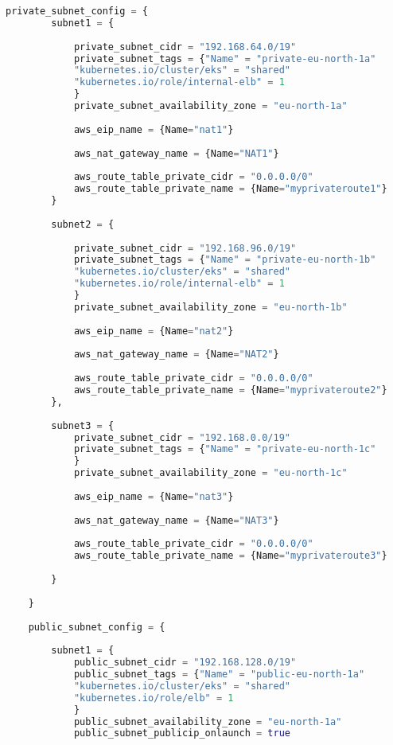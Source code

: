 \begin{lstlisting}[language=terraform]
    private_subnet_config = {
        subnet1 = {
    
            private_subnet_cidr = "192.168.64.0/19"
            private_subnet_tags = {"Name" = "private-eu-north-1a"
            "kubernetes.io/cluster/eks" = "shared"
            "kubernetes.io/role/internal-elb" = 1
            }
            private_subnet_availability_zone = "eu-north-1a"
    
            aws_eip_name = {Name="nat1"}
    
            aws_nat_gateway_name = {Name="NAT1"}
    
            aws_route_table_private_cidr = "0.0.0.0/0"
            aws_route_table_private_name = {Name="myprivateroute1"}
        }
    
        subnet2 = {
    
            private_subnet_cidr = "192.168.96.0/19"
            private_subnet_tags = {"Name" = "private-eu-north-1b"
            "kubernetes.io/cluster/eks" = "shared"
            "kubernetes.io/role/internal-elb" = 1
            }
            private_subnet_availability_zone = "eu-north-1b"
    
            aws_eip_name = {Name="nat2"}
    
            aws_nat_gateway_name = {Name="NAT2"}
    
            aws_route_table_private_cidr = "0.0.0.0/0"
            aws_route_table_private_name = {Name="myprivateroute2"}
        },
    
        subnet3 = {
            private_subnet_cidr = "192.168.0.0/19"
            private_subnet_tags = {"Name" = "private-eu-north-1c"
            }
            private_subnet_availability_zone = "eu-north-1c"
    
            aws_eip_name = {Name="nat3"}
    
            aws_nat_gateway_name = {Name="NAT3"}
    
            aws_route_table_private_cidr = "0.0.0.0/0"
            aws_route_table_private_name = {Name="myprivateroute3"}
    
        }  
    
    }
    
    public_subnet_config = {
        
        subnet1 = {
            public_subnet_cidr = "192.168.128.0/19"
            public_subnet_tags = {"Name" = "public-eu-north-1a"
            "kubernetes.io/cluster/eks" = "shared"
            "kubernetes.io/role/elb" = 1
            }
            public_subnet_availability_zone = "eu-north-1a"
            public_subnet_publicip_onlaunch = true
    

\end{lstlisting}

